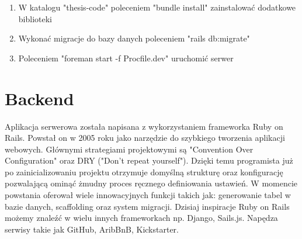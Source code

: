\documentclass[declaration,shortabstract]{iithesis}
\begin{document}
\begin{enumerate}
    \item W katalogu "thesis-code" poleceniem "bundle install" zainstalować dodatkowe biblioteki
    \item Wykonać migracje do bazy danych poleceniem "rails db:migrate"
    \item Poleceniem "foreman start -f Procfile.dev" uruchomić serwer
\end{enumerate}
\section{Backend}
Aplikacja serwerowa została napisana z wykorzystaniem frameworka Ruby on Rails. Powstał on w 2005 roku jako narzędzie do szybkiego tworzenia aplikacji webowych. Głównymi strategiami projektowymi są "Convention Over Configuration" oraz DRY ("Don't repeat yourself"). Dzięki temu programista już po zainicializowaniu projektu otrzymuje domyślną strukturę oraz konfigurację pozwalającą ominąć żmudny proces ręcznego definiowania ustawień. W momencie powstania oferował wiele innowacyjnych funkcji takich jak: generowanie tabel w bazie danych, scaffolding oraz system migracji. Dzisiaj inspiracje Ruby on Rails możemy znaleźć w wielu innych frameworkach np. Django, Sails.js. Napędza serwisy takie jak GitHub, AribBnB, Kickstarter.
\end{document}
